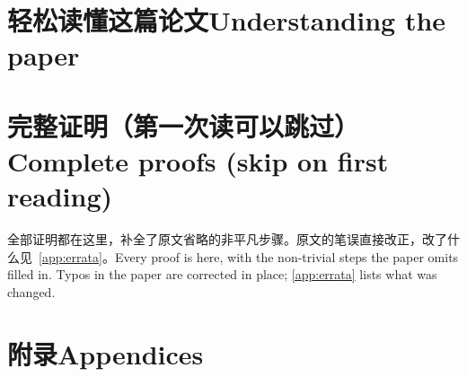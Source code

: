 \documentclass[11pt,a4paper,fontset=fandol]{ctexart}
\newcommand{\zhen}[2]{\ifzh#1\else#2\fi}
\numberwithin{equation}{section}
\begin{document}


\part{\zhen{轻松读懂这篇论文}{Understanding the paper}}



\part{\zhen{完整证明（第一次读可以跳过）}{Complete proofs (skip on first reading)}}
\zhen{全部证明都在这里，补全了原文省略的非平凡步骤。原文的笔误直接改正，改了什么见~\ref{app:errata}。}{Every proof is here, with the non-trivial steps the paper omits filled in. Typos in the paper are corrected in place; \ref{app:errata} lists what was changed.}

\part{\zhen{附录}{Appendices}}

\end{document}

